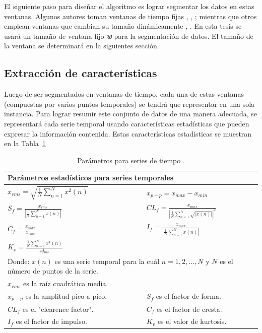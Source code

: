 El siguiente paso para diseñar el algoritmo es lograr segmentar los datos en estas ventanas. Algunos autores toman ventanas de tiempo fijas \cite{6083078}, \cite{4938719}, \cite{8207769}; mientras que otros emplean ventanas que cambian su tamaño dinámicamente \cite{Va-2013}, \cite{6957822}. En esta tesis se usará un tamaño de ventana fijo \textit{\textbf{w}} para la segmentación de datos. El tamaño de la ventana se determinará en la siguientes sección.

\subsection{Extracción de características}

Luego de ser segmentados en ventanas de tiempo, cada una de estas ventanas (compuestas por varios puntos temporales) se tendrá que representar en una sola instancia. Para lograr resumir este conjunto de datos de una manera adecuada, se representará cada serie temporal usando características estadísticas que pueden expresar la información contenida. Estas características estadísticas se muestran en la Tabla~\ref{diag:features}


\bgroup
\def\arraystretch{1.5}%
\begin{table}[htbp!]
\centering
\caption[Parámetros para series de tiempo]{Parámetros para series de tiempo \cite{Feature_extraction}.}
\begin{tabular}{p{}l}
\toprule
\multicolumn{2}{l}{Parámetros estadísticos para series temporales} \\ \midrule
$x_{rms}= \sqrt{\frac{1}{N}\sum_{n=1}^{N} x^{2}(n)} $  &
$ x_{p-p}=x_{max}-x_{min} $  \\
$ S_f=\displaystyle\frac{x_{rms}}{\left|\frac{1}{N}\sum_{n=1}^{N} x(n)\right|} $  &
$ CL_f=\displaystyle\frac{x_{max}}{\left|\frac{1}{N}\sum_{n=1}^{N} \sqrt{|x(n)|}\right|^{2}} $  \\
$ C_f=\displaystyle\frac{x_{max}}{x_{rms}} $  &
$ I_f=\displaystyle\frac{x_{max}}{\left|\frac{1}{N}\sum_{n=1}^{N} x(n)\right|} $ \\
$ K_v=\displaystyle\frac{\frac{1}{N}\sum_{n=1}^{N} x^{4}(n)}{x_{rms}^4} $ \\
\multicolumn{2}{p{\textwidth}}{Donde: \newline
$x(n)$ es una serie temporal para la cuál  $n = 1,2,...,N$ y $N$ es el número de puntos de la serie.}\\
$x_{rms}$ es la raíz cuadrática media. & \\
$ x_{p-p}$ es la amplitud pico a pico. &
$ S_f$ es el factor de forma. \\
$ CL_f$ es el "clearence factor". &
$ C_f$ es el factor de cresta. \\
$ I_f$ es el factor de impulso. &
$ K_v$ es el valor de kurtosis.  \\ \bottomrule
\end{tabular}
\label{diag:features}
\end{table}
\egroup

